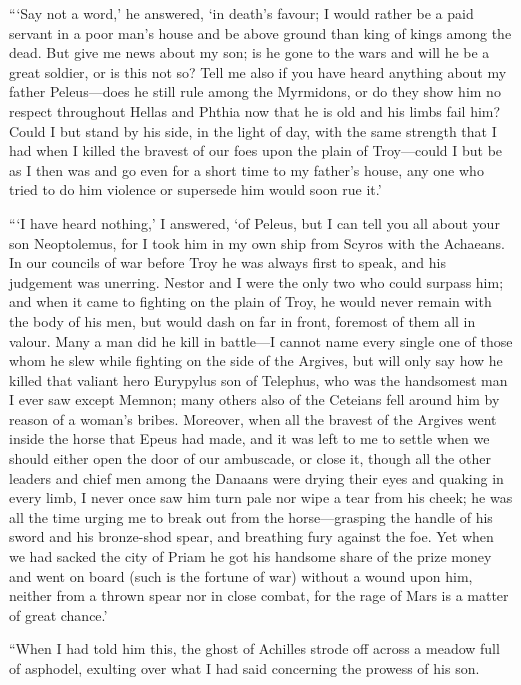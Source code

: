 “‘Say not a word,’ he answered, ‘in death’s favour; I would rather be a paid
servant in a poor man’s house and be above ground than king of kings among the
dead. But give me news about my son; is he gone to the wars and will he be a
great soldier, or is this not so? Tell me also if you have heard anything about
my father Peleus—does he still rule among the Myrmidons, or do they show him no
respect throughout Hellas and Phthia now that he is old and his limbs fail him?
Could I but stand by his side, in the light of day, with the same strength that
I had when I killed the bravest of our foes upon the plain of Troy—could I but
be as I then was and go even for a short time to my father’s house, any one who
tried to do him violence or supersede him would soon rue it.’

“‘I have heard nothing,’ I answered, ‘of Peleus, but I can tell you all about
your son Neoptolemus, for I took him in my own ship from Scyros with the
Achaeans. In our councils of war before Troy he was always first to speak, and
his judgement was unerring. Nestor and I were the only two who could surpass
him; and when it came to fighting on the plain of Troy, he would never remain
with the body of his men, but would dash on far in front, foremost of them all
in valour. Many a man did he kill in battle—I cannot name every single one of
those whom he slew while fighting on the side of the Argives, but will only say
how he killed that valiant hero Eurypylus son of Telephus, who was the
handsomest man I ever saw except Memnon; many others also of the Ceteians fell
around him by reason of a woman’s bribes. Moreover, when all the bravest of the
Argives went inside the horse that Epeus had made, and it was left to me to
settle when we should either open the door of our ambuscade, or close it,
though all the other leaders and chief men among the Danaans were drying their
eyes and quaking in every limb, I never once saw him turn pale nor wipe a tear
from his cheek; he was all the time urging me to break out from the
horse—grasping the handle of his sword and his bronze-shod spear, and breathing
fury against the foe. Yet when we had sacked the city of Priam he got his
handsome share of the prize money and went on board (such is the fortune of
war) without a wound upon him, neither from a thrown spear nor in close combat,
for the rage of Mars is a matter of great chance.’

“When I had told him this, the ghost of Achilles strode off across a meadow
full of asphodel, exulting over what I had said concerning the prowess of his
son.

